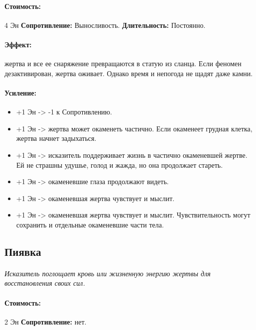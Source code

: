 \paragraph{} 
\textit{
\tbd}
\paragraph{Стоимость: }4 Эн
\newline
\textbf{Сопротивление: }Выносливость.
\newline 
\textbf{Длительность: }Постоянно.
\paragraph{Эффект: }жертва и все ее снаряжение превращаются в статую из сланца. Если феномен дезактивирован, жертва оживает. Однако время и непогода не щадят даже камни.
\paragraph{Усиление:}
\begin{itemize}
\item+1 Эн -> -1 к Сопротивлению.
\item+1 Эн -> жертва может окаменеть частично. Если окаменеет грудная клетка, жертва начнет задыхаться.
\item+1 Эн -> исказитель поддерживает жизнь в частично окаменевшей жертве. Ей не страшны удушье, голод и жажда, но она продолжает стареть.
\item+1 Эн -> окаменевшие глаза продолжают видеть.
\item+1 Эн -> окаменевшая жертва чувствует и мыслит.
\item+1 Эн -> окаменевшая жертва чувствует и мыслит. Чувствительность могут сохранить и отдельные окаменевшие части тела.
\end{itemize}
\subsection{Пиявка}
\paragraph{} 
\textit{Исказитель поглощает кровь или жизненную энергию жертвы для восстановления своих сил.}
\paragraph{Стоимость: }2 Эн
\newline
\textbf{Сопротивление: }нет.
